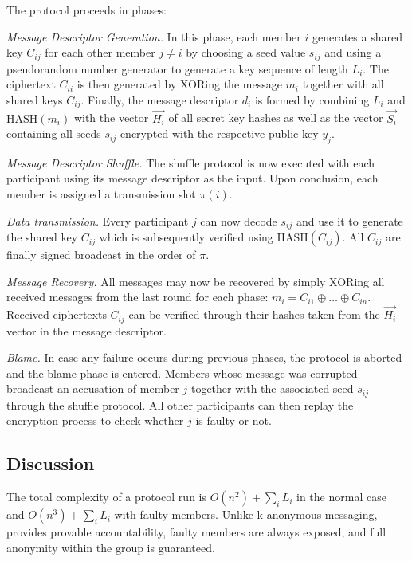 The protocol proceeds in phases:

\emph{Message Descriptor Generation.}
      In this phase, each member $i$ generates a shared key $C_{ij}$ for each other member $j \neq i$
      by choosing a seed value $s_{ij}$ and using a pseudorandom number generator \cite{stinson2006cryptography} to generate a
      key sequence of length $L_i$. The ciphertext $C_{ii}$ is then generated by
      XORing the message $m_i$ together with all shared keys $C_{ij}$. Finally, the message descriptor
      $d_i$ is formed by combining $L_i$ and $\text{HASH}(m_i)$ with the vector $\vec{H_i}$ of all secret key
      hashes as well as the vector $\vec{S_i}$ containing all seeds $s_{ij}$ encrypted with the respective
      public key $y_j$.

\emph{Message Descriptor Shuffle.}
      The shuffle protocol is now executed with each participant using its message descriptor
      as the input. Upon conclusion, each member is assigned a transmission slot $\pi(i)$.

\emph{Data transmission.}
      Every participant $j$ can now decode $s_{ij}$ and use it to generate the shared key $C_{ij}$ which
      is subsequently verified using $\text{HASH}(C_{ij})$. All $C_{ij}$ are finally signed broadcast in the order of $\pi$.
      
\emph{Message Recovery.}
      All messages may now be recovered by simply XORing all received messages from the last round for each phase: $m_i = C_{i1} \oplus \ldots \oplus C_{in}$. Received ciphertexts $C_{ij}$ can be verified
      through their hashes taken from the $\vec{H_i}$ vector in the message descriptor.

\emph{Blame.}
      In case any failure occurs during previous phases, the protocol is aborted and the blame phase is entered.
      Members whose message was corrupted broadcast an accusation of member $j$ together with the
      associated seed $s_{ij}$ through the shuffle protocol.
      All other participants can then replay the encryption process to check whether $j$
      is faulty or not.

\subsection{Discussion}
The total complexity of a protocol run is $O(n^2) + \sum_i L_i$ in the normal case
and $O(n^3) + \sum_i L_i$ with faulty members. Unlike k-anonymous messaging,
\Dissent provides provable accountability, faulty members are always exposed, and full anonymity
within the group is guaranteed.


